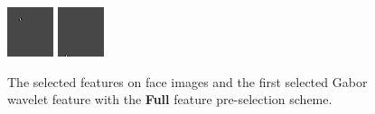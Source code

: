 \begin{figure}[ht]
 \includegraphics[width=\textwidth*11/100]{ch5/figures/firstgabor_Full_7.png}
 \includegraphics[width=\textwidth*11/100]{ch5/figures/firstgabor_Full_8.png}
\caption{The selected features on face images and the first selected Gabor wavelet feature with the \textbf{Full} feature pre-selection scheme.}
\label{fig:resultBGC1toC8full}
\end{figure} 
